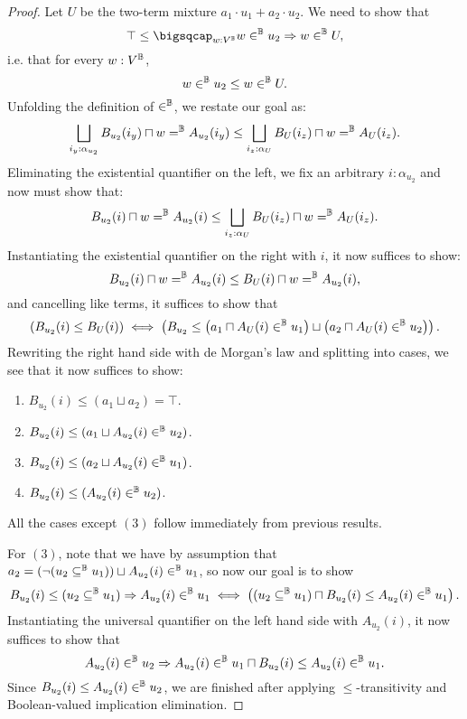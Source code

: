 \documentclass[11pt]{article}
\begin{document}
\begin{proof}
  Let $U$ be the two-term mixture $a_1 \cdot u_1 + a_2 \cdot u_2$. We need to show that
  $$
\top \leq \bigsqcap_{w : V^\B} w \in^\B u_2 \Rightarrow w \in^\B U,
$$
i.e. that for every $w : V^{\mathbb{B}}$,
$$
w \in^{\mathbb{B}} u_2 \leq w \in^{\mathbb{B}} U.
$$
Unfolding the definition of $\in^{\mathbb{B}}$, we restate our goal as:
$$
\bigsqcup_{i_y : \alpha_{u_2}} B_{u_2}(i_y) \sqcap w =^{\mathbb{B}} A_{u_2}(i_y) \leq \bigsqcup_{i_z : \alpha_{U}} B_U(i_z) \sqcap w =^{\mathbb{B}} A_U(i_z).
$$
Eliminating the existential quantifier on the left, we fix an arbitrary $i : \alpha_{u_2}$ and now must show that:
$$
B_{u_2}(i) \sqcap w =^{\mathbb{B}} A_{u_2}(i) \leq \bigsqcup_{i_z : \alpha_{U}} B_U(i_z) \sqcap w =^{\mathbb{B}} A_U(i_z).
$$
Instantiating the existential quantifier on the right with $i$, it now suffices to show:
$$
B_{u_2}(i) \sqcap w =^{\mathbb{B}} A_{u_2}(i) \leq B_U(i) \sqcap w =^{\mathbb{B}} A_{u_2}(i),
$$
and cancelling like terms, it suffices to show that
$$
\left(B_{u_2}(i)\leq B_U(i)\right) \iff \left(B_{u_2} \leq \left(a_1 \sqcap A_{U}(i) \in^{\mathbb{B}} u_1 \right) \sqcup \left(a_2 \sqcap A_{U}(i) \in^{\mathbb{B}} u_2 \right)\right).
$$
Rewriting the right hand side with de Morgan's law and splitting into cases, we see that it now suffices to show:
\begin{enumerate}
\item $B_{u_2}(i) \leq (a_1 \sqcup a_2) = \top$.
\item $B_{u_2}(i) \leq (a_1 \sqcup A_{u_2}(i) \in^{\mathbb{B}} u_2)$.
\item $B_{u_2}(i) \leq (a_2 \sqcup A_{u_2}(i) \in^{\mathbb{B}} u_1)$.
\item $B_{u_2}(i) \leq (A_{u_2}(i) \in^{\mathbb{B}} u_2)$.
\end{enumerate}

All the cases except $(3)$ follow immediately from previous results.

For $(3)$, note that we have by assumption that $a_2 = (\neg (u_2 \subseteq^{\mathbb{B}} u_1)) \sqcup A_{u_2}(i) \in^{\mathbb{B}} u_1$, so now our goal is to show
$$
B_{u_2}(i) \leq (u_2 \subseteq^{\mathbb{B}} u_1) \Rightarrow A_{u_2}(i) \in^{\mathbb{B}} u_1 \iff \left((u_2 \subseteq^{\mathbb{B}} u_1) \sqcap B_{u_2}(i) \leq A_{u_2}(i) \in^{\mathbb{B}} u_1\right).
$$
Instantiating the universal quantifier on the left hand side with $A_{u_2}(i)$, it now suffices to show that
$$
A_{u_2}(i) \in^{\mathbb{B}} u_2 \Rightarrow A_{u_2}(i) \in^{\mathbb{B}} u_1 \sqcap B_{u_2}(i) \leq A_{u_2}(i) \in^{\mathbb{B}} u_1.
$$
Since $B_{u_2}(i) \leq A_{u_2}(i) \in^{\mathbb{B}} u_2$, we are finished after applying $\leq$-transitivity and Boolean-valued implication elimination.
\end{proof}
\end{document}
